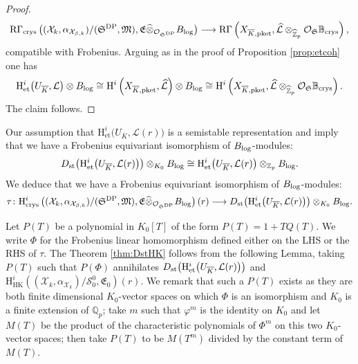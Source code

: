 \documentclass[asterisque,english]{smfart}
\begin{document}
\begin{proof}
$$ \mathrm{R}\Gamma_{\mathrm{crys}}\left((\mathcal{X}_k,\alpha_{\mathcal{X}_{\beta,k}})/(\mathfrak{S}^{\rm DP},\mathfrak{M}),\mathfrak{E} \widehat{\otimes}_{\mathcal{O}_{\mathfrak{S}^{\rm DP}}} B_{\rm log}\right)  \longrightarrow \mathrm{R}\Gamma\left(X_{\overline{K},\mathrm{pket}},\widehat{\mathcal{L}}\otimes_{\widehat{\mathbb{Z}}_p} \mathcal{O}_{\mathfrak{S}} \mathbb{B}_{\mathrm{crys}}\right) ,$$compatible with Frobenius. Arguing as in the proof of Proposition \ref{prop:etcoh} one has $$\mathrm{H}^i_{\mathrm{et}}\bigl(U_{\overline{K}},  \mathcal{L}\bigr)\otimes  B_{\rm log}
\cong  \mathrm{H}^i\left(X_{\overline{K},\mathrm{pket}},\widehat{\mathcal{L}}\right)\otimes B_{\rm log}\cong \mathrm{H}^i\left(X_{\overline{K},\mathrm{pket}},\widehat{\mathcal{L}}\otimes_{\widehat{\mathbb{Z}}_p} \mathcal{O}_{\mathfrak{S}} \mathbb{B}_{\mathrm{crys}}\right) .$$The claim follows.
\end{proof} 

Our assumption that $ \mathrm{H}^i_{\mathrm{et}}\bigl(U_{\overline{K}},  \mathcal{L}(r)\bigr)$ is a semistable representation and \cite[Thm. 3.3]{Breuil} imply that we have a Frobenius equivariant isomorphism of $B_{\rm log}$-modules:
\begin{equation}\label{eq:breuilst} D_{\rm st}\bigl(\mathrm{H}^i_{\mathrm{et}}\bigl(U_{\overline{K}}, \mathcal{L}(r)\bigr) \bigr) \otimes_{K_0} B_{\rm log} \cong \mathrm{H}^i_{\mathrm{et}}\bigl(U_{\overline{K}},  \mathcal{L}(r)\bigr)\otimes_{\mathbb{Z}_p}  B_{\rm log}.
\end{equation}We deduce that we have  a Frobenius equivariant isomorphism of $B_{\rm log}$-modules:
$$\tau\colon \mathrm{H}^i_{\mathrm{crys}}\left((\mathcal{X}_k,\alpha_{\mathcal{X}_{\beta,k}})/(\mathfrak{S}^{\rm DP},\mathfrak{M}),\mathfrak{E} \widehat{\otimes}_{\mathcal{O}_{\mathfrak{S}^{\rm DP}}} B_{\rm log}\right)(r)\longrightarrow D_{\rm st}\bigl(\mathrm{H}^i_{\mathrm{et}}\bigl(U_{\overline{K}}, \mathcal{L}(r)\bigr) \bigr) \otimes_{K_0} B_{\rm log} .$$








Let $P(T)$ be a polynomial in $K_0[T]$ of the form $P(T)=1+TQ(T)$.  We write $\Phi$ for the Frobenius linear homomorphism defined either on the LHS or the RHS of $\tau$.  The Theorem \ref{thm:DstHK} follows from the following Lemma, taking $P(T)$ such that $P(\Phi)$ annihilates  $D_{\rm st}\bigl(\mathrm{H}^i_{\mathrm{et}}\bigl(U_{\overline{K}}, \mathcal{L}(r)\bigr) \bigr)$ and  $ \mathrm{H}^i_{\mathrm{HK}}\left((\mathcal{X}_k,\alpha_{\mathcal{X}_k})/ \mathcal{S}_0^0,\mathfrak{E}_0 \right)(r)$. We remark that such a $P(T)$ exists as they are both finite dimensional $K_0$-vector spaces on which $\Phi$ is an isomorphism and  $K_0$ is a finite extension of $\mathbb{Q}_p$; take $m$ such that $\varphi^m$ is the identity on $K_0$ and let $M(T)$ be the  product of the characteristic polynomials of $\Phi^m$ on this two $K_0$-vector spaces; then take $P(T)$ to be $M(T^m)$ divided by the constant term of $M(T)$.
\end{document}
